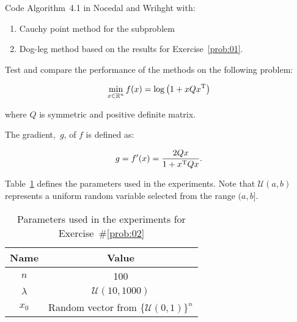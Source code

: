 \begin{problem}\label{prob:02}
  Code Algorithm~4.1 in Nocedal and Wrihght with:
  
  \begin{enumerate}
    \item Cauchy point method for the subproblem
    \item Dog-leg method based on the results for Exercise~\ref{prob:01}.
  \end{enumerate}

  \noindent
  Test and compare the performance of the methods on the following problem:
  
  \[\min_{x\in \mathbb{R}^n} f(x) = \log\left(1+xQx^{\textnormal{T}}\right)\]
  
  \noindent
  where $Q$ is symmetric and positive definite matrix.
\end{problem}


The gradient,~$g$, of $f$ is defined as: 

\[g = f'(x) = \frac{2Qx}{1+x^{\textnormal{T}} Q x}\text{.}\]

Table~\ref{tab:p02:experimentParameters} defines the parameters used in the experiments.  Note that $\mathcal{U}(a,b)$ represents a uniform random variable selected from the range $(a,b]$.

\begin{table}[h]
  \caption{Parameters used in the experiments for Exercise~\#\ref{prob:02}}\label{tab:p02:experimentParameters}
  \centering
  \begin{tabular}{|c|c|}
    \hline
    \textbf{Name} & \textbf{Value} \\\hline
    \hline
    $n$       &   100\\\hline
    $\lambda$ &   $\mathcal{U}(10,1000)$ \\\hline
    $x_0$     &   Random vector from $\{\mathcal{U}(0,1)\}^{n}$\\\hline
  \end{tabular}
\end{table}
